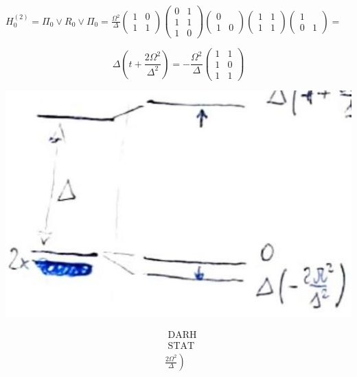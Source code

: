 \documentclass[10pt]{article}
\begin{document}
$H_{0}^{(2)}=\Pi_{0} \vee R_{0} \vee \Pi_{0}=\frac{\Omega^{2}}{\Delta}\left(\begin{array}{ll}1 & 0 \\ 1 & 1\end{array}\right)\left(\begin{array}{ll}0 & 1 \\ 1 & 1 \\ 1 & 0\end{array}\right)\left(\begin{array}{ll}0 & \\ 1 & 0\end{array}\right)\left(\begin{array}{ll}1 & 1 \\ 1 & 1\end{array}\right)\left(\begin{array}{ll}1 & \\ 0 & 1\end{array}\right)=$

$$
\Delta\left(t+\frac{2 \Omega^{2}}{\Delta^{2}}\right)=-\frac{\Omega^{2}}{\Delta}\left(\begin{array}{ll}
1 & 1 \\
1 & 0 \\
1 & 1
\end{array}\right)
$$

\begin{center}
\includegraphics[max width=\textwidth]{2025_10_16_f6b2ddb567eefef2c7a2g-4}
\end{center}

$$
\begin{aligned}
& \text { DARH } \\
& \text { STAT } \\
& \left.\frac{2 \Omega^{2}}{\Delta}\right)
\end{aligned}
$$
\end{document}

